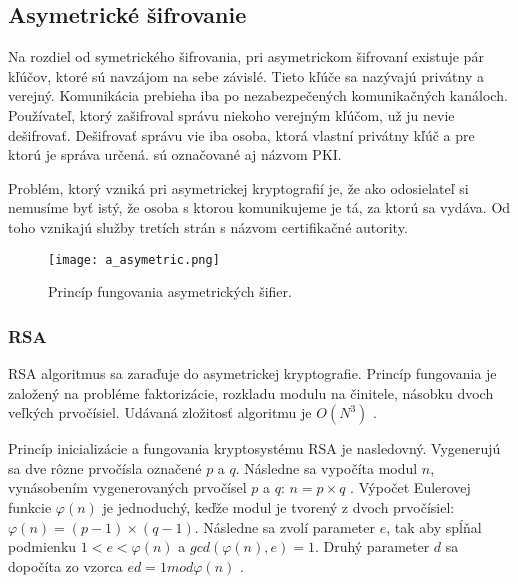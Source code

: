 \documentclass[12pt,a4wide,oneside,openright]{report}
\begin{document}

\subsection{Asymetrické šifrovanie}  \label{s_cpyt_asymetric}
Na rozdiel od symetrického šifrovania, pri asymetrickom šifrovaní existuje pár kľúčov, ktoré sú navzájom na sebe závislé. Tieto kľúče sa nazývajú privátny a verejný. Komunikácia prebieha iba po nezabezpečených komunikačných kanáloch. Používateľ, ktorý zašifroval správu niekoho verejným kľúčom, už ju nevie dešifrovať. Dešifrovať správu vie iba osoba, ktorá vlastní privátny kľúč a pre ktorú je správa určená.  sú označované aj názvom PKI.

Problém, ktorý vzniká pri asymetrickej kryptografií je, že ako odosielateľ si nemusíme byť istý, že osoba s ktorou komunikujeme je tá, za ktorú sa vydáva. Od toho vznikajú služby tretích strán s názvom certifikačné autority.

\begin{figure*}[!htb]
	\centering
	\texttt{[image: a\_asymetric.png]}
	\caption{Princíp fungovania asymetrických šifier. \cite{cryptographyhandbook}}
	\label{f:o_asymetric}
\end{figure*}

\subsubsection{RSA}
RSA algoritmus sa zaraďuje do asymetrickej kryptografie. Princíp fungovania je založený na probléme faktorizácie, rozkladu modulu na činitele, násobku dvoch veľkých prvočísiel. Udávaná zložitosť algoritmu je $O(N^3)$ \cite{rsalesson}.

Princíp inicializácie a fungovania kryptosystému RSA je nasledovný. Vygenerujú sa dve rôzne prvočísla označené $p$ a $q$. Následne sa vypočíta modul $n$, vynásobením vygenerovaných prvočísel $p$ a $q$: $n= p \times q $ \cite{rsalesson}.
Výpočet Eulerovej funkcie $\varphi(n)$ je jednoduchý, keďže modul je tvorený z dvoch prvočísiel: $\varphi(n)=(p-1)\times(q-1)$. Následne sa zvolí parameter $e$, tak aby spĺňal podmienku $1<e<\varphi(n)$ a $gcd(\varphi(n),e)=1$. Druhý parameter $d$ sa dopočíta zo vzorca $ed=1 mod \varphi(n)$ \cite{rsalesson}.
\end{document}
